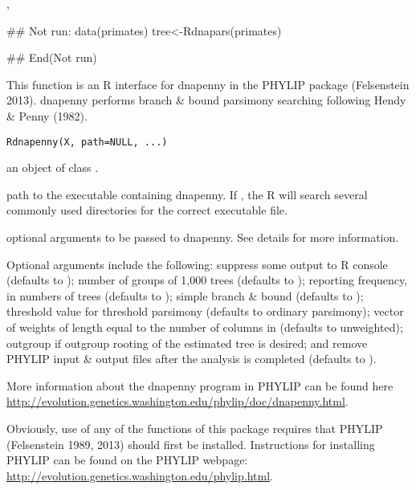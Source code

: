 \documentclass[a4paper]{book}
\begin{document}
%
\begin{SeeAlso}\relax
{}, 
\end{SeeAlso}
%
\begin{Examples}
\begin{ExampleCode}
## Not run: 
data(primates)
tree<-Rdnapars(primates)

## End(Not run)
\end{ExampleCode}
\end{Examples}
%
\begin{Description}\relax
This function is an R interface for dnapenny in the PHYLIP package (Felsenstein 2013). dnapenny performs branch \& bound parsimony searching following Hendy \& Penny (1982).
\end{Description}
%
\begin{Usage}
\begin{verbatim}
Rdnapenny(X, path=NULL, ...)
\end{verbatim}
\end{Usage}
%
\begin{Arguments}
\begin{ldescription}
\item[\code{X}] an object of class .
\item[\code{path}] path to the executable containing dnapenny. If , the R will search several commonly used directories for the correct executable file.
\item[\code{...}] optional arguments to be passed to dnapenny. See details for more information.
\end{ldescription}
\end{Arguments}
%
\begin{Details}\relax
Optional arguments include the following:  suppress some output to R console (defaults to );  number of groups of 1,000 trees (defaults to );  reporting frequency, in numbers of trees (defaults to );  simple branch \& bound (defaults to );  threshold value for threshold parsimony (defaults to ordinary parsimony);  vector of weights of length equal to the number of columns in  (defaults to unweighted);  outgroup if outgroup rooting of the estimated tree is desired; and  remove PHYLIP input \& output files after the analysis is completed (defaults to ).

More information about the dnapenny program in PHYLIP can be found here \url{http://evolution.genetics.washington.edu/phylip/doc/dnapenny.html}.

Obviously, use of any of the functions of this package requires that PHYLIP (Felsenstein 1989, 2013) should first be installed. Instructions for installing PHYLIP can be found on the PHYLIP webpage: \url{http://evolution.genetics.washington.edu/phylip.html}.
\end{Details}
\end{document}
